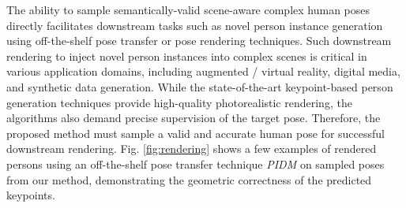 The ability to sample semantically-valid scene-aware complex human poses directly facilitates downstream tasks such as novel person instance generation using off-the-shelf pose transfer or pose rendering techniques. Such downstream rendering to inject novel person instances into complex scenes is critical in various application domains, including augmented / virtual reality, digital media, and synthetic data generation. While the state-of-the-art keypoint-based person generation techniques provide high-quality photorealistic rendering, the algorithms also demand precise supervision of the target pose. Therefore, the proposed method must sample a valid and accurate human pose for successful downstream rendering. Fig. \ref{fig:rendering} shows a few examples of rendered persons using an off-the-shelf pose transfer technique \emph{PIDM} \cite{bhunia2023person} on sampled poses from our method, demonstrating the geometric correctness of the predicted keypoints.
